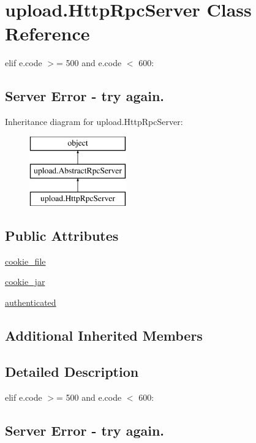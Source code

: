 \hypertarget{classupload_1_1_http_rpc_server}{}\section{upload.\+Http\+Rpc\+Server Class Reference}
\label{classupload_1_1_http_rpc_server}


elif e.\+code $>$= 500 and e.\+code $<$ 600\+: \subsection*{Server Error -\/ try again.} 


Inheritance diagram for upload.\+Http\+Rpc\+Server\+:\begin{figure}[H]
\begin{center}
\leavevmode
\includegraphics[height=3.000000cm]{classupload_1_1_http_rpc_server}
\end{center}
\end{figure}
\subsection*{Public Attributes}
\begin{DoxyCompactItemize}
\item 
\hyperlink{classupload_1_1_http_rpc_server_ad5c1a730c030f9d3b5f70c2e0d8b9a1d}{cookie\+\_\+file}
\item 
\hyperlink{classupload_1_1_http_rpc_server_a1b9c9af7f0a46afd84a9d524782323bf}{cookie\+\_\+jar}
\item 
\hyperlink{classupload_1_1_http_rpc_server_aaa356e2491537dd0d4bfc5b1bb0fec96}{authenticated}
\end{DoxyCompactItemize}
\subsection*{Additional Inherited Members}


\subsection{Detailed Description}
elif e.\+code $>$= 500 and e.\+code $<$ 600\+: \subsection*{Server Error -\/ try again.}

